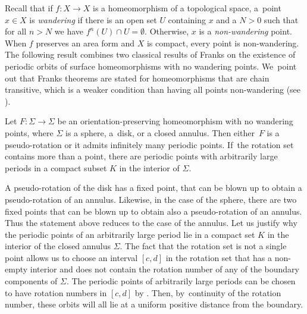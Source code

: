 Recall that if $f:X\to X$ is a homeomorphism of a topological space, a~point $x\in X$ is \emph{wandering} if there is an open set $U$ containing $x$ and a $N>0$ such that for all $n>N$ we have $f^n(U)\cap U=\emptyset$. Otherwise, $x$ is a \emph{non-wandering} point. When $f$ preserves an area form and $X$ is compact, every point is non-wandering. The following result combines two classical results of Franks \cite{F1, F2} on the existence of periodic orbits of surface homeomorphisms with no wandering points. We~point out that Franks theorems are stated for homeomorphisms that are chain transitive, which is a weaker condition than having all points non-wandering (see \cite[Prop.\,1.2]{F1}).

\begin{theorem}\label{thm:Fk}
Let $F:\Sigma \rightarrow \Sigma$ be an orientation-preserving homeomorphism with no wandering points, where $\Sigma$ is a sphere, a~disk, or a closed annulus. Then either~$F$ is a pseudo-rotation or it admits infinitely many periodic points. If~the rotation set contains more than a point, there are periodic points with arbitrarily large periods in a compact subset $K$ in the interior of $\Sigma$.
\end{theorem}

{A pseudo-rotation of the disk has a fixed point, that can be blown up to obtain a pseudo-rotation of an annulus. Likewise, in the case of the sphere, there are two fixed points that can be blown up to obtain also a pseudo-rotation of an annulus. Thus the statement above reduces to the case of the annulus.}{ Let us justify why the periodic points of an arbitrarily large period lie in a compact set $K$ in the interior of the closed annulus $\Sigma$. The fact that the rotation set is not a single point allows us to choose an interval $[c,d]$ in the rotation set that has a non-empty interior and does not contain the rotation number of any of the boundary components of $\Sigma$. The periodic points of arbitrarily large periods can be chosen to have rotation numbers in $[c,d]$ by \cite[Cor.\,2.4]{F1}. Then, by~continuity of the rotation number, these orbits will all lie at a uniform positive distance from the boundary.}

